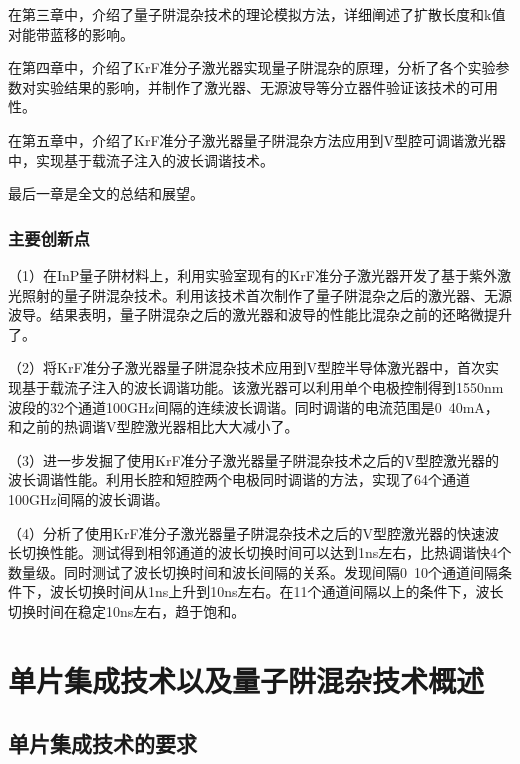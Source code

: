 \documentclass{ZJUthesis}
\begin{document}
在第三章中，介绍了量子阱混杂技术的理论模拟方法，详细阐述了扩散长度和k值对能带蓝移的影响。

在第四章中，介绍了KrF准分子激光器实现量子阱混杂的原理，分析了各个实验参数对实验结果的影响，并制作了激光器、无源波导等分立器件验证该技术的可用性。

在第五章中，介绍了KrF准分子激光器量子阱混杂方法应用到V型腔可调谐激光器中，实现基于载流子注入的波长调谐技术。

最后一章是全文的总结和展望。

\subsection{主要创新点}

（1）在InP量子阱材料上，利用实验室现有的KrF准分子激光器开发了基于紫外激光照射的量子阱混杂技术。利用该技术首次制作了量子阱混杂之后的激光器、无源波导。结果表明，量子阱混杂之后的激光器和波导的性能比混杂之前的还略微提升了。

（2）将KrF准分子激光器量子阱混杂技术应用到V型腔半导体激光器中，首次实现基于载流子注入的波长调谐功能。该激光器可以利用单个电极控制得到1550nm波段的32个通道100GHz间隔的连续波长调谐。同时调谐的电流范围是0~40mA，和之前的热调谐V型腔激光器相比大大减小了。

（3）进一步发掘了使用KrF准分子激光器量子阱混杂技术之后的V型腔激光器的波长调谐性能。利用长腔和短腔两个电极同时调谐的方法，实现了64个通道100GHz间隔的波长调谐。

（4）分析了使用KrF准分子激光器量子阱混杂技术之后的V型腔激光器的快速波长切换性能。测试得到相邻通道的波长切换时间可以达到1ns左右，比热调谐快4个数量级。同时测试了波长切换时间和波长间隔的关系。发现间隔0~10个通道间隔条件下，波长切换时间从1ns上升到10ns左右。在11个通道间隔以上的条件下，波长切换时间在稳定10ns左右，趋于饱和。

\chapter{单片集成技术以及量子阱混杂技术概述}

\section{单片集成技术的要求}
\end{document}
